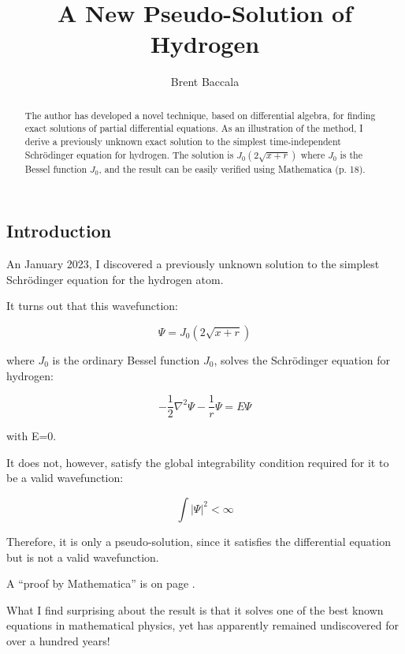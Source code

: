\documentclass{article}
\title{A New Pseudo-Solution of Hydrogen}
\author{Brent Baccala}
\begin{document}
\parindent 0pt

\maketitle

\begin{abstract}
The author has developed a novel technique, based on differential algebra,
for finding exact solutions of partial
differential equations.  As an illustration of the method,
I derive a previously unknown exact solution to the simplest time-independent Schr\"odinger equation for hydrogen.
The solution is $J_0(2\sqrt{x+r})$ where $J_0$ is the Bessel function $J_0$, and
the result can be easily verified using Mathematica (p. 18).
\end{abstract}

\parskip 12pt

\subsection*{Introduction}

An January 2023, I discovered a previously unknown solution to the simplest Schrödinger equation for the hydrogen atom.

It turns out that this wavefunction:

\begin{equation}
\Psi = J_0(2\sqrt{x+r})
\end{equation}

where $J_0$ is the ordinary Bessel function $J_0$, solves the Schrödinger equation for hydrogen:

\begin{equation}
-\frac{1}{2}\nabla^2 \Psi - \frac{1}{r}\Psi = E \Psi
\end{equation}

with E=0.

It does not, however, satisfy the global integrability condition required for it to be a valid wavefunction:

\begin{equation}
\int|\Psi|^2 < \infty
\end{equation}

Therefore, it is only a pseudo-solution, since it satisfies the differential equation but is not a valid wavefunction.

A ``proof by Mathematica'' is on page \pageref{verification}.

What I find surprising about the result is that it solves one of the best known equations in mathematical physics, yet has apparently remained undiscovered for over a hundred years!
\end{document}
